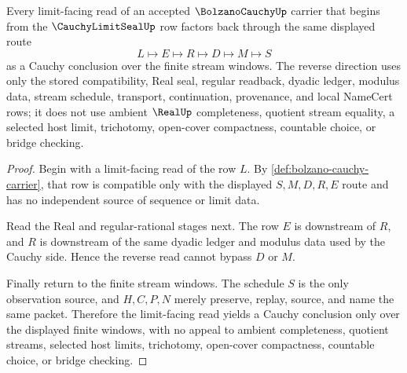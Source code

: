 \begin{theorem}
\label{thm:bolzano-cauchy-limit-to-cauchy-route}
Every limit-facing read of an accepted $\BolzanoCauchyUp$ carrier that begins from the $\CauchyLimitSealUp$ row factors back through the same displayed route
$$
L \longmapsto E \longmapsto R \longmapsto D \longmapsto M \longmapsto S
$$
as a Cauchy conclusion over the finite stream windows. The reverse direction uses only the stored compatibility, Real seal, regular readback, dyadic ledger, modulus data, stream schedule, transport, continuation, provenance, and local NameCert rows; it does not use ambient $\RealUp$ completeness, quotient stream equality, a selected host limit, trichotomy, open-cover compactness, countable choice, or bridge checking.
\end{theorem}
\begin{proof}
Begin with a limit-facing read of the row $L$. By \autoref{def:bolzano-cauchy-carrier}, that row is compatible only with the displayed $S,M,D,R,E$ route and has no independent source of sequence or limit data.

Read the Real and regular-rational stages next. The row $E$ is downstream of $R$, and $R$ is downstream of the same dyadic ledger and modulus data used by the Cauchy side. Hence the reverse read cannot bypass $D$ or $M$.

Finally return to the finite stream windows. The schedule $S$ is the only observation source, and $H,C,P,N$ merely preserve, replay, source, and name the same packet. Therefore the limit-facing read yields a Cauchy conclusion only over the displayed finite windows, with no appeal to ambient completeness, quotient streams, selected host limits, trichotomy, open-cover compactness, countable choice, or bridge checking.
\end{proof}

